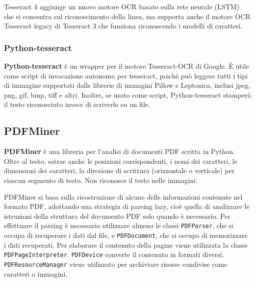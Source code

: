 Tesseract 4 aggiunge un nuovo motore OCR basato sulla rete neurale (LSTM) che si concentra sul riconoscimento della linea, ma supporta anche il motore OCR Tesseract legacy di Tesseract 3 che funziona riconoscendo i modelli di caratteri.

\subsubsection{Python-tesseract}
\textbf{Python-tesseract} è un wrapper per il motore Tesseract-OCR di Google. È utile come script di invocazione autonomo per tesseract, poiché può leggere tutti i tipi di immagine supportati dalle librerie di immagini Pillow e Leptonica, inclusi jpeg, png, gif, bmp, tiff e altri. Inoltre, se usato come script, Python-tesseract stamperà il testo riconosciuto invece di scriverlo su un file.

\subsection{PDFMiner}
\textbf{PDFMiner} è una libreria per l’analisi di documenti PDF scritta in Python. Oltre al testo, estrae anche le posizioni corrispondenti, i nomi dei caratteri, le dimensioni dei caratteri, la direzione di scrittura (orizzontale o verticale) per ciascun segmento di testo. Non riconosce il testo nelle immagini.

PDFMiner si basa sulla ricostruzione di alcune delle informazioni contenute nel formato PDF, adottando una strategia di parsing lazy, cioè quella di analizzare le istruzioni della struttura del documento PDF solo quando è necessario.
Per effettuare il parsing è necessario utilizzare almeno le classi \texttt{PDFParser}, che si occupa di recuperare i dati dal file, e \texttt{PDFDocument}, che si occupa di memorizzare i dati recuperati.
Per elaborare il contenuto della pagine viene utilizzata la classe \texttt{PDFPageInterpreter}. \texttt{PDFDevice} converte il contenuto in formati diversi. \texttt{PDFResourceManager} viene utilizzato per archiviare risorse condivise come caratteri o immagini.